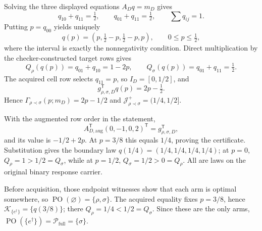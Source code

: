 Solving the three displayed equations \(A_Dq=m_D\) gives
\[
q_{10}+q_{11}=\tfrac12,
\qquad q_{01}+q_{11}=\tfrac12,
\qquad \sum q_{ij}=1.
\]
Putting \(p=q_{00}\) yields uniquely
\[
q(p)=(p,\tfrac12-p,\tfrac12-p,p),
\qquad 0\le p\le\tfrac12,
\]
where the interval is exactly the nonnegativity condition.  Direct multiplication by the checker-constructed target rows gives
\[
Q_\rho(q(p))=q_{01}+q_{10}=1-2p,
\qquad Q_\sigma(q(p))=q_{01}+q_{11}=\tfrac12.
\]
The acquired cell row selects \(q_{11}=p\), so \(I_D=[0,1/2]\), and
\[
g_{\rho,\sigma,D}^{\mathsf T}q(p)=2p-\tfrac12.
\]
Hence \(\Gamma_{\rho\prec\sigma}(p;m_D)=2p-1/2\) and \(\mathcal J_{\rho\prec\sigma}^+=(1/4,1/2]\).

With the augmented row order in the statement,
\[
A_{D,\mathrm{aug}}^{\mathsf T}(0,-1,0,2)^{\mathsf T}
=g_{\rho,\sigma,D}^{\mathsf T},
\]
and its value is \(-1/2+2p\).  At \(p=3/8\) this equals \(1/4\), proving the certificate.  Substitution gives the boundary law \(q(1/4)=(1/4,1/4,1/4,1/4)\); at \(p=0\), \(Q_\rho=1>1/2=Q_\sigma\), while at \(p=1/2\), \(Q_\sigma=1/2>0=Q_\rho\).  All are laws on the original binary response carrier.

Before acquisition, those endpoint witnesses show that each arm is optimal somewhere, so \(\operatorname{PO}(\varnothing)=\{\rho,\sigma\}\).  The acquired equality fixes \(p=3/8\), hence \(\mathcal K_{\{e^\dagger\}}=\{q(3/8)\}\); there \(Q_\rho=1/4<1/2=Q_\sigma\).  Since these are the only arms, \(\operatorname{PO}(\{e^\dagger\})=\mathcal P_{\mathrm{full}}=\{\sigma\}\).